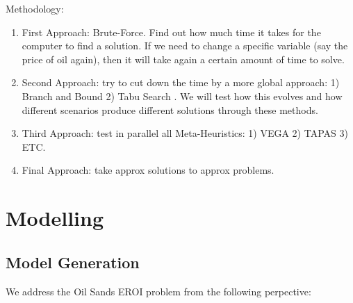 \documentclass[12pt]{article}
\newcommand{\h}[1]{\colorbox{yellow}{#1}}
\begin{document}
Methodology:
\begin{enumerate}
\item First Approach: Brute-Force. Find out how much time it takes for the computer to find a solution. If we need to change a specific variable (say the price of oil again), then it will take again a certain amount of time to solve. 


\item Second Approach: try to cut down the time by a more global approach: 1) Branch and Bound 2) Tabu Search . We will test how this evolves and how different scenarios produce different solutions through these methods. 
\item Third Approach: test in parallel all Meta-Heuristics: 1) VEGA 2) TAPAS 3) ETC. 


\item Final Approach: take approx solutions to approx problems. 


\end{enumerate}


\section{Modelling}

\subsection{Model Generation}

We address the Oil Sands EROI problem from the following perpective: \\
\end{document}
